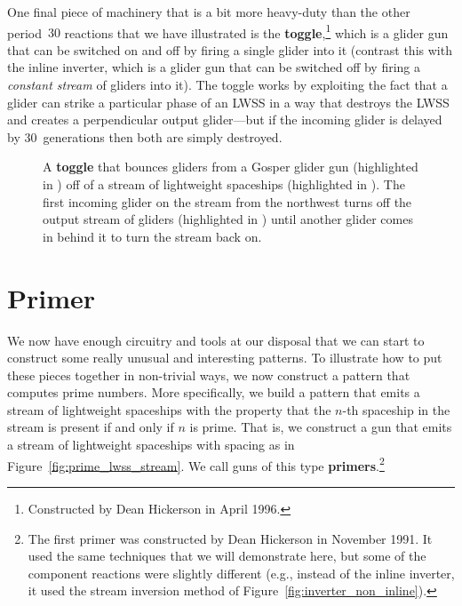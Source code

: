 One final piece of machinery that is a bit more heavy-duty than the other period~$30$ reactions that we have illustrated is the \textbf{toggle},\footnote{Constructed by Dean Hickerson in April 1996.} which is a glider gun that can be switched on and off by firing a single glider into it (contrast this with the inline inverter, which is a glider gun that can be switched off by firing a \emph{constant stream} of gliders into it). The toggle works by exploiting the fact that a glider can strike a particular phase of an LWSS in a way that destroys the LWSS and creates a perpendicular output glider---but if the incoming glider is delayed by $30$~generations then both are simply destroyed.

\begin{figure}[!htb]
	\centering
	\caption{A \textbf{toggle} that bounces gliders from a Gosper glider gun (highlighted in ) off of a stream of lightweight spaceships (highlighted in ). The first incoming glider on the  stream from the northwest turns off the output stream of gliders (highlighted in ) until another glider comes in behind it to turn the stream back on.}
	\label{fig:toggle}
\end{figure}


\section{Primer}\label{sec:primer}

We now have enough circuitry and tools at our disposal that we can start to construct some really unusual and interesting patterns. To illustrate how to put these pieces together in non-trivial ways, we now construct a pattern that computes prime numbers. More specifically, we build a pattern that emits a stream of lightweight spaceships with the property that the $n$-th spaceship in the stream is present if and only if $n$ is prime. That is, we construct a gun that emits a stream of lightweight spaceships with spacing as in Figure~\ref{fig:prime_lwss_stream}. We call guns of this type \textbf{primers}.\footnote{The first primer was constructed by Dean Hickerson in November 1991. It used the same techniques that we will demonstrate here, but some of the component reactions were slightly different (e.g., instead of the inline inverter, it used the stream inversion method of Figure~\ref{fig:inverter_non_inline}).}

